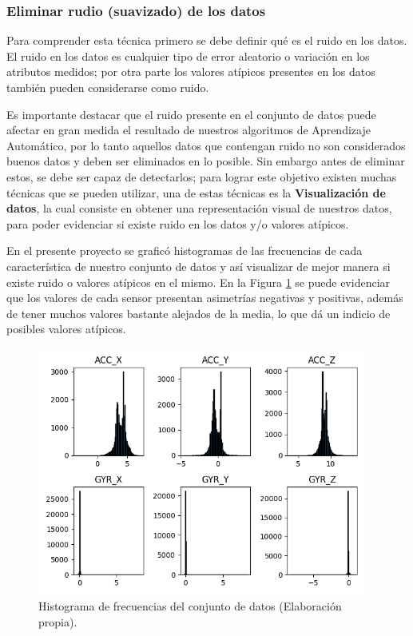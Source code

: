 \subsubsection{Eliminar rudio (suavizado) de los datos}

Para comprender esta t\'{e}cnica primero se debe definir qu\'{e} es el ruido en los datos. El ruido en los datos es cualquier tipo de error aleatorio o variaci\'{o}n en los atributos medidos; por otra parte los valores at\'{i}picos presentes en los datos tambi\'{e}n pueden considerarse como ruido. 

\vspace{5mm} %

Es importante destacar que el ruido presente en el conjunto de datos puede afectar en gran medida el resultado de nuestros algoritmos de Aprendizaje Autom\'{a}tico, por lo tanto aquellos datos que contengan ruido no son considerados buenos datos y deben ser eliminados en lo posible. Sin embargo antes de eliminar estos, se debe ser capaz de detectarlos; para lograr este objetivo existen muchas t\'{e}cnicas que se pueden utilizar, una de estas t\'{e}cnicas es la \textbf{Visualizaci\'{o}n de datos}, la cual consiste en obtener una representaci\'{o}n visual de nuestros datos, para poder evidenciar si existe ruido en los datos y/o valores at\'{i}picos.

\vspace{5mm} %

En el presente proyecto se grafic\'{o} histogramas de las frecuencias de cada caracter\'{i}stica de nuestro conjunto de datos y as\'{i} visualizar de mejor manera si existe ruido o valores at\'{i}picos en el mismo. En la Figura \ref{fig:hist} se puede evidenciar que los valores de cada sensor presentan asimetr\'{i}as negativas y positivas, adem\'{a}s de tener muchos valores bastante alejados de la media, lo que d\'{a} un indicio de posibles valores at\'{i}picos.

\begin{figure}[h!]
  \begin{center}	\includegraphics[width=0.97\textwidth,frame]{imagenes/Cap3/histograma_sensores}
  \caption{Histograma de frecuencias del conjunto de datos (Elaboraci\'{o}n propia).}
  \label{fig:hist}
  \end{center}
\end{figure}

